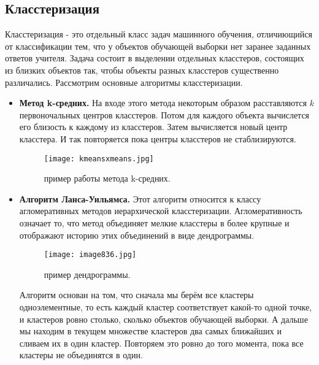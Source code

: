 \documentclass[a4paper]{article}
\begin{document}
 \subsection{Класстеризация}
 Класстеризация - это отдельный класс задач машинного обучения, отличиющийся от классификации тем, что у объектов обучающей выборки нет заранее заданных ответов учителя. Задача состоит в выделении отдельных класстеров, состоящих из близких объектов так, чтобы объекты разных класстеров существенно различались. Рассмотрим основные алгоритмы класстеризации.
 \begin{itemize}
 \item \textbf{Метод k-средних.} На входе этого метода некоторым образом расставляются $k$ первоночальных центров класстеров. Потом для каждого объекта вычислется его близость к каждому из класстеров. Затем вычисляется новый центр класстера. И так повторяется пока центры класстеров не стаблизируются.
 \begin{figure}[h!]
 	\centering
 	\texttt{[image: kmeansxmeans.jpg]}
 	\caption{пример работы метода k-средних.}
 	\label{ris:image1}
 \end{figure}
 \item \textbf{Алгоритм Ланса-Уильямса.} Этот алгоритм относится к классу агломеративных методов иерархической класстеризации. Агломеративность означает то, что метод объединяет мелкие класстеры в более крупные и отображают историю этих объединений в виде дендрограммы.\\
 
 \begin{figure}[h!]
 	\centering
 	\texttt{[image: image836.jpg]}
 	\caption{пример дендрограммы.}
 	\label{ris:image1}
 \end{figure}
 
 Алгоритм основан на том, что сначала мы берём все кластеры одноэлементные,
 то есть каждый кластер соответствует какой-то одной точке,
 и кластеров ровно столько, сколько объектов обучающей выборки.
 А дальше мы находим в текущем множестве кластеров два самых ближайших и
 сливаем их в один кластер. Повторяем это ровно до того момента, пока все кластеры не объединятся в один.\\
 

\end{itemize}
\end{document}
